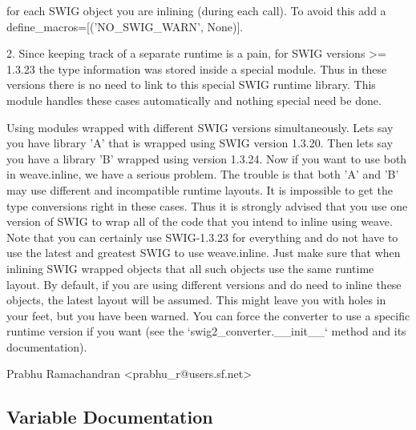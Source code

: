 \begin{DoxyVerb}
    for each SWIG object you are inlining (during each call).  To
    avoid this add a define_macros=[('NO_SWIG_WARN', None)].

 2. Since keeping track of a separate runtime is a pain, for SWIG
    versions >= 1.3.23 the type information was stored inside a
    special module.  Thus in these versions there is no need to link
    to this special SWIG runtime library.  This module handles these
    cases automatically and nothing special need be done.

    Using modules wrapped with different SWIG versions simultaneously.
    Lets say you have library 'A' that is wrapped using SWIG version
    1.3.20.  Then lets say you have a library 'B' wrapped using
    version 1.3.24.  Now if you want to use both in weave.inline, we
    have a serious problem.  The trouble is that both 'A' and 'B' may
    use different and incompatible runtime layouts.  It is impossible
    to get the type conversions right in these cases.  Thus it is
    strongly advised that you use one version of SWIG to wrap all of
    the code that you intend to inline using weave.  Note that you can
    certainly use SWIG-1.3.23 for everything and do not have to use
    the latest and greatest SWIG to use weave.inline.  Just make sure
    that when inlining SWIG wrapped objects that all such objects use
    the same runtime layout.  By default, if you are using different
    versions and do need to inline these objects, the latest layout
    will be assumed.  This might leave you with holes in your feet,
    but you have been warned.  You can force the converter to use a
    specific runtime version if you want (see the
    `swig2_converter.__init__` method and its documentation).


Prabhu Ramachandran <prabhu_r@users.sf.net>
\end{DoxyVerb}
 

\subsection{Variable Documentation}
\hypertarget{namespacescipy_1_1weave_1_1swig2__spec_ae4058ddac77e8e030972783bc0359818}{}
